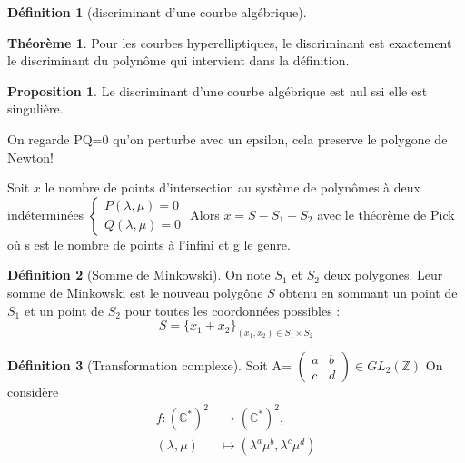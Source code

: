 \documentclass{article}
\newcommand{\C}{\mathbb{C}} %
\newcommand{\Z}{\mathbb{Z}} %
\theoremstyle{definition} %
\newtheorem{defi}{Définition}
\newtheorem{thm}{Théorème}
\newtheorem{prop}{Proposition}
\newcommand{\1}{\mathbb{1}} %
\begin{document}
\begin{defi}[discriminant d'une courbe algébrique]

\end{defi}



\begin{thm}
Pour les courbes hyperelliptiques, le discriminant est exactement le discriminant du polynôme qui intervient dans la définition.
\end{thm}

\begin{prop}
Le discriminant d'une courbe algébrique est nul ssi elle est singulière.
\end{prop}


On regarde PQ=0 qu'on perturbe avec un epsilon, cela preserve le polygone de Newton!


\begin{tcolorbox}[colback=blue!5!white,colframe=blue!75!black,title=Théorème de Koushirenko-Bernstein]
    Soit $x$ le nombre de points d'intersection au système de polynômes à deux indéterminées
    $\begin{cases}
       P(\lambda,\mu)=0 \\
        Q(\lambda,\mu)=0
    \end{cases}$
    Alors 
    $x=S - S_1 - S_2$
    avec le théorème de Pick où s est le nombre de points à l'infini et g le genre.
\end{tcolorbox}

\begin{defi}[Somme de Minkowski]
    On note $S_1$ et $S_2$ deux polygones.
    Leur somme de Minkowski est le nouveau polygône $S$ obtenu en sommant un point de $S_1$ et un point de $S_2$ pour toutes les coordonnées possibles :
    $$S=\{x_1 + x_2\}_{(x_1,x_2) \in S_1 \times S_2}$$ 

\end{defi}

\begin{defi}[Transformation complexe]
Soit A=
$\begin{pmatrix}
   a & b \\
   c & d
\end{pmatrix}
\in GL_2(\Z)$
On considère
\begin{align*} f : (\C^*)^2 &\to (\C^*)^2, \\
(\lambda,\mu) &\mapsto (\lambda^{a} \mu^{b},\lambda^{c} \mu^{d})
\end{align*}

\end{defi}
\end{document}
